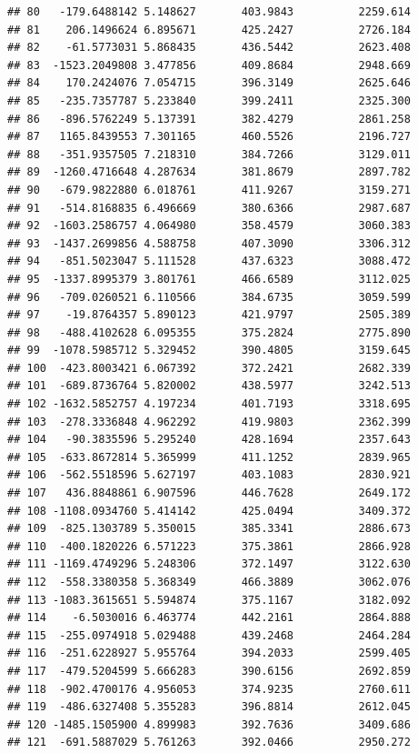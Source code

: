 \documentclass[
]{article}
\begin{document}
\begin{verbatim}
## 80   -179.6488142 5.148627       403.9843          2259.614
## 81    206.1496624 6.895671       425.2427          2726.184
## 82    -61.5773031 5.868435       436.5442          2623.408
## 83  -1523.2049808 3.477856       409.8684          2948.669
## 84    170.2424076 7.054715       396.3149          2625.646
## 85   -235.7357787 5.233840       399.2411          2325.300
## 86   -896.5762249 5.137391       382.4279          2861.258
## 87   1165.8439553 7.301165       460.5526          2196.727
## 88   -351.9357505 7.218310       384.7266          3129.011
## 89  -1260.4716648 4.287634       381.8679          2897.782
## 90   -679.9822880 6.018761       411.9267          3159.271
## 91   -514.8168835 6.496669       380.6366          2987.687
## 92  -1603.2586757 4.064980       358.4579          3060.383
## 93  -1437.2699856 4.588758       407.3090          3306.312
## 94   -851.5023047 5.111528       437.6323          3088.472
## 95  -1337.8995379 3.801761       466.6589          3112.025
## 96   -709.0260521 6.110566       384.6735          3059.599
## 97    -19.8764357 5.890123       421.9797          2505.389
## 98   -488.4102628 6.095355       375.2824          2775.890
## 99  -1078.5985712 5.329452       390.4805          3159.645
## 100  -423.8003421 6.067392       372.2421          2682.339
## 101  -689.8736764 5.820002       438.5977          3242.513
## 102 -1632.5852757 4.197234       401.7193          3318.695
## 103  -278.3336848 4.962292       419.9803          2362.399
## 104   -90.3835596 5.295240       428.1694          2357.643
## 105  -633.8672814 5.365999       411.1252          2839.965
## 106  -562.5518596 5.627197       403.1083          2830.921
## 107   436.8848861 6.907596       446.7628          2649.172
## 108 -1108.0934760 5.414142       425.0494          3409.372
## 109  -825.1303789 5.350015       385.3341          2886.673
## 110  -400.1820226 6.571223       375.3861          2866.928
## 111 -1169.4749296 5.248306       372.1497          3122.630
## 112  -558.3380358 5.368349       466.3889          3062.076
## 113 -1083.3615651 5.594874       375.1167          3182.092
## 114    -6.5030016 6.463774       442.2161          2864.888
## 115  -255.0974918 5.029488       439.2468          2464.284
## 116  -251.6228927 5.955764       394.2033          2599.405
## 117  -479.5204599 5.666283       390.6156          2692.859
## 118  -902.4700176 4.956053       374.9235          2760.611
## 119  -486.6327408 5.355283       396.8814          2612.045
## 120 -1485.1505900 4.899983       392.7636          3409.686
## 121  -691.5887029 5.761263       392.0466          2950.272

\end{verbatim}
\end{document}
